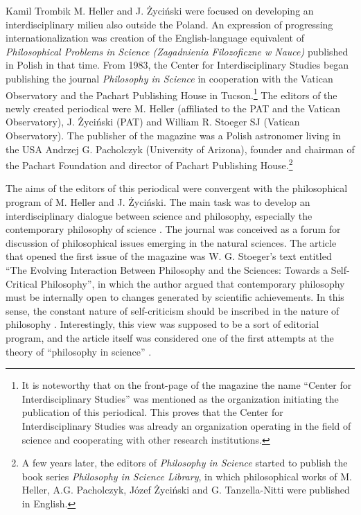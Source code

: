 \begin{artengenv}{Kamil Trombik}
M. Heller and J. Życiński were focused on developing an interdisciplinary milieu also outside the Poland. An expression
of progressing internationalization was creation of the English-language equivalent of \textit{Philosophical Problems
in Science (Zagadnienia Filozoficzne w Nauce) }published in Polish in that time. From 1983, the Center for
Interdisciplinary Studies began publishing the journal \textit{Philosophy in Science} in cooperation with the Vatican
Observatory and the Pachart Publishing House in Tucson.\footnote{It is noteworthy that on the front-page of the
magazine the name ``Center for Interdisciplinary Studies'' was mentioned as the organization initiating the publication
of this periodical. This proves that the Center for Interdisciplinary Studies was already an organization operating in
the field of science and cooperating with other research institutions.} The editors of the newly created periodical
were M. Heller (affiliated to the PAT and the Vatican Observatory), J. Życiński (PAT) and William R.
Stoeger SJ (Vatican Observatory). The publisher of the magazine was a Polish astronomer living in the USA Andrzej G.
Pacholczyk (University of Arizona), founder and chairman of the Pachart Foundation and director of Pachart Publishing
House.\footnote{A few years later, the editors of \textit{Philosophy in Science} started to publish the book series
\textit{Philosophy in Science Library}, in which philosophical works of M. Heller, A.G. Pacholczyk, Józef Życiński and
G. Tanzella-Nitti were published in English.}

The aims of the editors of this periodical were convergent with the philosophical program of M. Heller and J. Życiński.
The main task was to develop an interdisciplinary dialogue between science and philosophy, especially the contemporary
philosophy of science
\parencite[p.8]{heller_introduction_1983}.
The
journal was conceived as a forum for discussion of philosophical issues emerging in the natural sciences. The article
that opened the first issue of the magazine was W. G. Stoeger's text entitled ``The Evolving Interaction Between
Philosophy and the Sciences: Towards a Self-Critical Philosophy'', in which the author argued that contemporary philosophy
must be internally open to changes generated by scientific achievements. In this sense, the constant nature of
self-criticism should be inscribed in the nature of philosophy
\parencite[pp.39--43]{stoeger_evolving_1983}.
Interestingly, this view was supposed to
be a sort of editorial program, and the article itself was considered one of the first attempts at the theory of
``philosophy in science''
\parencites[p.7]{heller_jak_1986}[p.\pageref{heller-stoeger}]{heller_how_2019}.


\end{artengenv}
